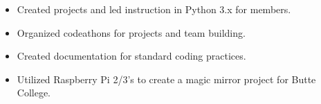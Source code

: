 \documentclass[10pt,a4paper,ragged2e,withhyper]{altacv}
\begin{document}

    \begin{itemize}
      \item Created projects and led instruction in Python 3.x for members.
      \item Organized codeathons for projects and team building.
      \item Created documentation for standard coding practices.
      \item Utilized Raspberry Pi 2/3's to create a magic mirror project for Butte College.
    \end{itemize}

  
\end{document}
